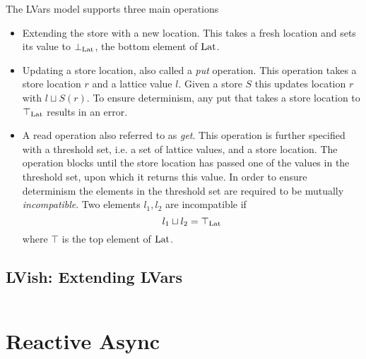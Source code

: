 The LVars model supports three main operations
\begin{itemize}
  \item Extending the store with a new location. This takes a fresh location and
    sets its value to $\bot_{\mathrm{Lat}}$, the bottom element of $\mathrm{Lat}$.
  \item Updating a store location, also called a \emph{put} operation. This
    operation takes a store location $r$ and a lattice value $l$. Given a store
    $S$ this updates location $r$ with $l \sqcup S(r)$. To ensure determinism,
    any put that takes a store location to $\top_{\mathrm{Lat}}$ results in an
    error.
  \item A read operation also referred to as \emph{get}. This operation is
    further specified with a threshold set, i.e. a set of lattice values, and a
    store location. The operation blocks until the store location has passed one
    of the values in the threshold set, upon which it returns this value. In
    order to ensure determinism the elements in the threshold set are required
    to be mutually \emph{incompatible}. Two elements $l_1, l_2$ are incompatible if
    \begin{equation*}
      l_1 \sqcup l_2 = \top_{\mathrm{Lat}}
    \end{equation*}
    where $\top$ is the top element of $\mathrm{Lat}$.
\end{itemize}


\subsection{LVish: Extending LVars}%
\label{sub:lvish_extending_lvars}


\begin{equation}
\end{equation}


\section{Reactive Async}\label{sec:reactive_async}

